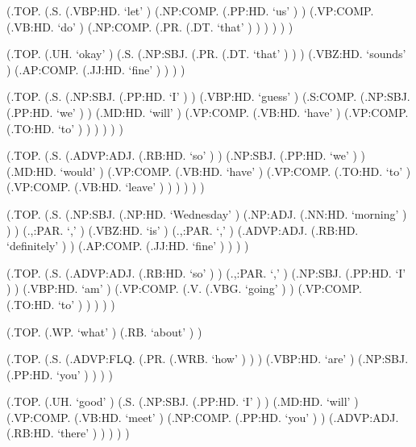 \documentclass[10pt]{article}
\begin{document}
\begin{parsetree}  (.TOP. (.S. (.VBP:HD. `let' ) (.NP:COMP. (.PP:HD. `us' ) ) (.VP:COMP. (.VB:HD. `do' ) (.NP:COMP. (.PR. (.DT. `that' ) ) ) ) ) ) \end{parsetree}

\begin{parsetree}  (.TOP. (.UH. `okay' ) (.S. (.NP:SBJ. (.PR. (.DT. `that' ) ) ) (.VBZ:HD. `sounds' ) (.AP:COMP. (.JJ:HD. `fine' ) ) ) ) \end{parsetree}

\begin{parsetree}  (.TOP. (.S. (.NP:SBJ. (.PP:HD. `I' ) ) (.VBP:HD. `guess' ) (.S:COMP. (.NP:SBJ. (.PP:HD. `we' ) ) (.MD:HD. `will' ) (.VP:COMP. (.VB:HD. `have' ) (.VP:COMP. (.TO:HD. `to' ) ) ) ) ) ) \end{parsetree}

\begin{parsetree}  (.TOP. (.S. (.ADVP:ADJ. (.RB:HD. `so' ) ) (.NP:SBJ. (.PP:HD. `we' ) ) (.MD:HD. `would' ) (.VP:COMP. (.VB:HD. `have' ) (.VP:COMP. (.TO:HD. `to' ) (.VP:COMP. (.VB:HD. `leave' ) ) ) ) ) ) \end{parsetree}

\begin{parsetree}  (.TOP. (.S. (.NP:SBJ. (.NP:HD. `Wednesday' ) (.NP:ADJ. (.NN:HD. `morning' ) ) ) (.,:PAR. `,' ) (.VBZ:HD. `is' ) (.,:PAR. `,' ) (.ADVP:ADJ. (.RB:HD. `definitely' ) ) (.AP:COMP. (.JJ:HD. `fine' ) ) ) ) \end{parsetree}

\begin{parsetree}  (.TOP. (.S. (.ADVP:ADJ. (.RB:HD. `so' ) ) (.,:PAR. `,' ) (.NP:SBJ. (.PP:HD. `I' ) ) (.VBP:HD. `am' ) (.VP:COMP. (.V. (.VBG. `going' ) ) (.VP:COMP. (.TO:HD. `to' ) ) ) ) ) \end{parsetree}

\begin{parsetree}  (.TOP. (.WP. `what' ) (.RB. `about' ) ) \end{parsetree}

\begin{parsetree}  (.TOP. (.S. (.ADVP:FLQ. (.PR. (.WRB. `how' ) ) ) (.VBP:HD. `are' ) (.NP:SBJ. (.PP:HD. `you' ) ) ) ) \end{parsetree}

\begin{parsetree}  (.TOP. (.UH. `good' ) (.S. (.NP:SBJ. (.PP:HD. `I' ) ) (.MD:HD. `will' ) (.VP:COMP. (.VB:HD. `meet' ) (.NP:COMP. (.PP:HD. `you' ) ) (.ADVP:ADJ. (.RB:HD. `there' ) ) ) ) ) \end{parsetree}
\end{document}
